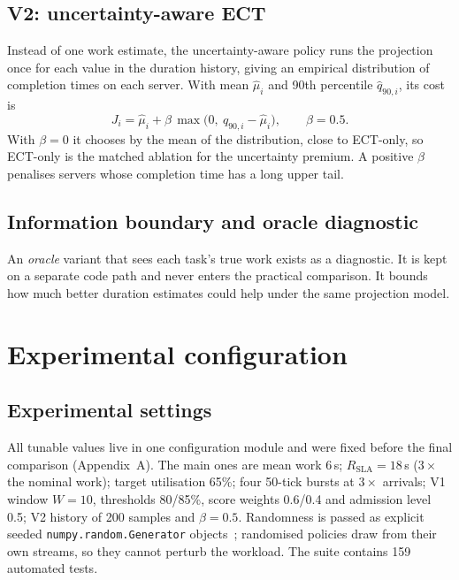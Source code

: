 \documentclass[11pt,a4paper]{article}
\newcommand{\code}[1]{\texttt{#1}}
\begin{document}
\subsection{V2: uncertainty-aware ECT}\label{sec:uect}
Instead of one work estimate, the uncertainty-aware policy runs the projection once for each value in the
duration history, giving an empirical distribution of completion times on each server. With mean
$\hat\mu_i$ and 90th percentile $\hat q_{90,i}$, its cost is
\begin{equation}
  J_i = \hat\mu_i + \beta\,\max\bigl(0,\ \hat q_{90,i}-\hat\mu_i\bigr), \qquad \beta = 0.5 .
\end{equation}
With $\beta=0$ it chooses by the mean of the distribution, close to ECT-only, so ECT-only is the matched
ablation for the uncertainty premium. A positive $\beta$ penalises servers whose completion time has a long
upper tail.

\subsection{Information boundary and oracle diagnostic}
An \emph{oracle} variant that sees each task's true work exists as a diagnostic. It is kept on a separate code
path and never enters the practical comparison. It bounds how much better duration estimates could help
under the same projection model.

\section{Experimental configuration}

\subsection{Experimental settings}
All tunable values live in one configuration module and were fixed before the final comparison
(Appendix~A). The main ones are mean work 6\,s; $R_{\mathrm{SLA}}=18$\,s ($3\times$ the nominal work);
target utilisation 65\%; four 50-tick bursts at $3\times$ arrivals; V1 window $W=10$, thresholds 80/85\%,
score weights 0.6/0.4 and admission level 0.5; V2 history of 200 samples and $\beta=0.5$. Randomness is passed
as explicit seeded \code{numpy.random.Generator} objects~\cite{harris2020}; randomised policies draw from their
own streams, so they cannot perturb the workload. The suite contains 159 automated tests.
\end{document}
